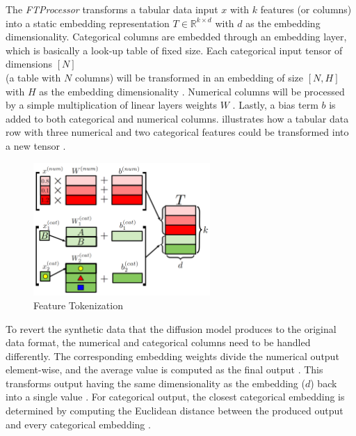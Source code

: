 The \textit{FTProcessor} transforms a tabular data input $x$ with $k$ features (or columns) into a static embedding representation $T \in \mathbb{R}^{k\times d}$ with $d$ as the embedding dimensionality.
Categorical columns are embedded through an embedding layer, which is basically a look-up table \cite{pytorch2023EmbeddingPyTorch13} of fixed size.
Each categorical input tensor of dimensions $[N]$ \\(\ie a table with $N$ columns) will be transformed in an embedding of size $[N,H]$ with $H$ as the embedding dimensionality \cite{gorishniy2021RevisitingDeepLearning}.
Numerical columns will be processed by a simple multiplication of linear layers weights $W$ \cite{gorishniy2021RevisitingDeepLearning}.
Lastly, a bias term $b$ is added to both categorical and numerical columns.
 illustrates how a tabular data row with three numerical and two categorical features could be transformed into a new tensor \cite[Figure 2a, p.4]{gorishniy2021RevisitingDeepLearning}.

\begin{figure}[h]
	\centering
	\includegraphics[width=0.6\textwidth]{images/ft.png}
	\caption[Feature Tokenization]{Feature Tokenization \cite[Figure 2a, p.4]{gorishniy2021RevisitingDeepLearning}}
	\label{fig:ft}
\end{figure}

To revert the synthetic data that the diffusion \gls{model} produces to the original data format, the numerical and categorical columns need to be handled differently.
The corresponding embedding weights divide the numerical output element-wise, and the average value is computed as the final output \cite{zheng2022DiffusionModelsMissing}.
This transforms output having the same dimensionality as the embedding ($d$) back into a single value \cite{zheng2022DiffusionModelsMissing}.
For categorical output, the closest categorical embedding is determined by computing the Euclidean distance between the produced output and every categorical embedding \cite{zheng2022DiffusionModelsMissing}.


